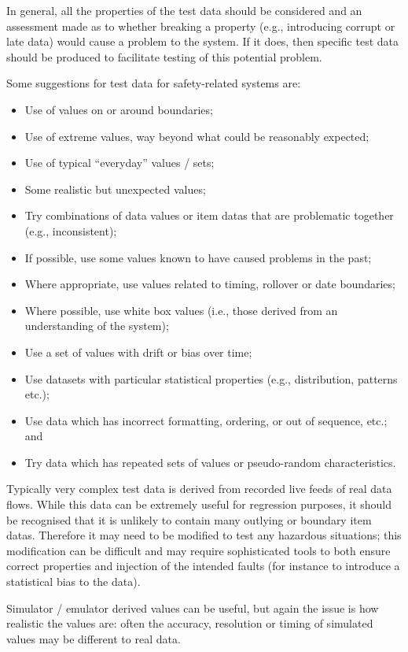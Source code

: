 In general, all the properties of the test data should be considered and an assessment made as to whether breaking a property (e.g., introducing corrupt or late data) would cause a problem to the system. If it does, then specific test data should be produced to facilitate testing of this potential problem.

Some suggestions for test data for safety-related systems are:
\begin{itemize}
  \item Use of values on or around boundaries;
  \item Use of extreme values, way beyond what could be reasonably expected;
  \item Use of typical ``everyday'' values / sets;
  \item Some realistic but unexpected values;
  \item Try combinations of data values or \glspl{item data} that are problematic together (e.g., inconsistent);
  \item If possible, use some values known to have caused problems in the past;
  \item Where appropriate, use values related to timing, rollover or date boundaries;
  \item Where possible, use white box values (i.e., those derived from an understanding of the system);
  \item Use a set of values with drift or bias over time;
  \item Use \glspl{dataset} with particular statistical properties (e.g., distribution, patterns etc.);
  \item Use data which has incorrect formatting, ordering, or out of sequence, etc.; and
  \item Try data which has repeated sets of values or pseudo-random characteristics.
\end{itemize}
Typically very complex test data is derived from recorded live feeds of real data flows. While this data can be extremely useful for regression purposes, it should be recognised that it is unlikely to contain many outlying or boundary \glspl{item data}. Therefore it may need to be modified to test any hazardous situations; this modification can be difficult and may require sophisticated tools to both ensure correct properties and injection of the intended faults (for instance to introduce a statistical bias to the data).

Simulator / emulator derived values can be useful, but again the issue is how realistic the values are: often the \gls{accuracy}, \gls{resolution} or timing of simulated values may be different to real data.

